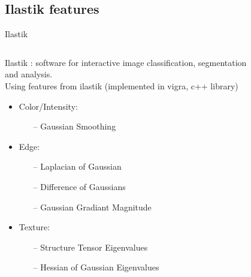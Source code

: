 \documentclass{beamer}
\begin{document}
\subsection{Ilastik features}

\begin{frame}{Ilastik}
\begin{columns}[T] %
\begin{column}{.8\textwidth}

Ilastik : software for interactive image classification, segmentation and analysis. \\
Using features from ilastik (implemented in vigra, c++ library)
\begin{itemize}
\item Color/Intensity:
\begin{itemize}
\item [--] Gaussian Smoothing
\end{itemize}
\item Edge:
\begin{itemize}
\item [--] Laplacian of Gaussian
\item [--] Difference of Gaussians
\item [--] Gaussian Gradiant Magnitude
\end{itemize}
\item Texture:
\begin{itemize}
\item [--] Structure Tensor Eigenvalues
\item [--] Hessian of Gaussian Eigenvalues
\end{itemize}
\end{itemize}
\end{column}%
\begin{column}{.2\textwidth}
\begin{figure}[!ht]
\centering

\end{figure}
\end{column}
\end{columns}
\end{frame}
\end{document}
